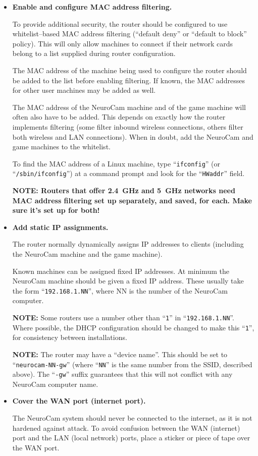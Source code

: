 \begin{itemize}
\item \textbf{Enable and configure MAC address filtering.}

To provide additional security, the router should be configured to use
whitelist--based MAC address filtering (``default deny'' or ``default to
block'' policy). This will only allow machines to connect if their network
cards belong to a list supplied during router configuration.

The MAC address of the machine being used to configure the router should be
added to the list before enabling filtering. If known, the MAC addresses for
other user machines may be added as well.

The MAC address of the NeuroCam machine and of the game machine will often
also have to be added. This depends on exactly how the router implements
filtering (some filter inbound wireless connections, others filter both
wireless and LAN connections). When in doubt, add the NeuroCam and game
machines to the whitelist.

To find the MAC address of a Linux machine, type ``\verb+ifconfig+''
(or ``\verb+/sbin/ifconfig+'') at a command prompt and look for the
``\verb+HWaddr+'' field.

\textbf{NOTE: Routers that offer 2.4~GHz and 5~GHz networks need MAC address
filtering set up separately, and saved, for each. Make sure it's set up for
both!}

\item \textbf{Add static IP assignments.}

The router normally dynamically assigns IP addresses to clients (including
the NeuroCam machine and the game machine).

Known machines can be assigned fixed IP addresses. At minimum the NeuroCam
machine should be given a fixed IP address. These usually take the form
``\verb+192.168.1.NN+'', where NN is the number of the NeuroCam computer.

\textbf{NOTE:} Some routers use a number other than ``\verb+1+'' in
``\verb+192.168.1.NN+''. Where possible, the DHCP configuration should be
changed to make this ``\verb+1+'', for consistency between installations.

\textbf{NOTE:} The router may have a ``device name''. This should be set
to ``\verb+neurocam-NN-gw+'' (where ``\verb+NN+'' is the same number from
the SSID, described above). The ``\verb+-gw+'' suffix guarantees that this
will not conflict with any NeuroCam computer name.

\item \textbf{Cover the WAN port (internet port).}

The NeuroCam system should never be connected to the internet, as it is not
hardened against attack. To avoid confusion between the WAN (internet) port
and the LAN (local network) ports, place a sticker or piece of tape over the
WAN port.
%
\end{itemize}

